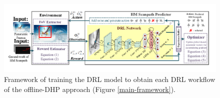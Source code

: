 \documentclass[10pt,journal,compsoc]{IEEEtran}
\begin{document}
\begin{figure}
	\begin{center}
		\centerline{\includegraphics[width=1.5\columnwidth]{figures/dhp_approach/training_framework}}%
		\caption{\footnotesize{Framework of training the DRL model to obtain each DRL workflow of the offline-DHP approach (Figure \ref{main-framework}).}}
		\label{train-framework}
	\end{center}
\end{figure}
\end{document}
